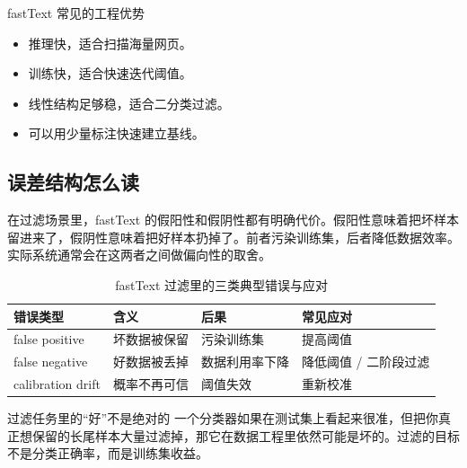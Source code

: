 \begin{knowledgebox}{fastText 常见的工程优势}
\begin{itemize}
    \item 推理快，适合扫描海量网页。
    \item 训练快，适合快速迭代阈值。
    \item 线性结构足够稳，适合二分类过滤。
    \item 可以用少量标注快速建立基线。
\end{itemize}
\end{knowledgebox}

\subsection{误差结构怎么读}

在过滤场景里，fastText 的假阳性和假阴性都有明确代价。假阳性意味着把坏样本留进来了，假阴性意味着把好样本扔掉了。前者污染训练集，后者降低数据效率。实际系统通常会在这两者之间做偏向性的取舍。

\begin{table}[H]
\centering
\small
\renewcommand{\arraystretch}{1.15}
\begin{tabular}{p{2.7cm}p{4.1cm}p{4.1cm}p{2.8cm}}
\toprule
\textbf{错误类型} & \textbf{含义} & \textbf{后果} & \textbf{常见应对} \\
\midrule
false positive & 坏数据被保留 & 污染训练集 & 提高阈值 \\
false negative & 好数据被丢掉 & 数据利用率下降 & 降低阈值 / 二阶段过滤 \\
calibration drift & 概率不再可信 & 阈值失效 & 重新校准 \\
\bottomrule
\end{tabular}
\caption{fastText 过滤里的三类典型错误与应对}
\end{table}

\begin{warningbox}{过滤任务里的“好”不是绝对的}
一个分类器如果在测试集上看起来很准，但把你真正想保留的长尾样本大量过滤掉，那它在数据工程里依然可能是坏的。过滤的目标不是分类正确率，而是训练集收益。
\end{warningbox}

